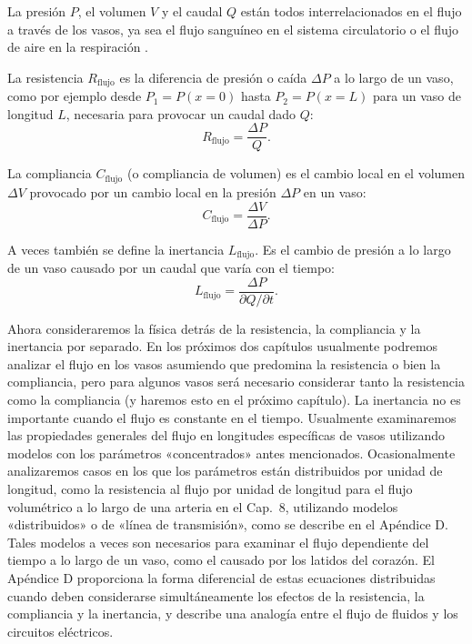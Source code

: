 \documentclass[12pt]{book}
\begin{document}
La presión $P$, el volumen $V$ y el caudal $Q$ están todos interrelacionados en el flujo a través de los vasos, ya sea el flujo sanguíneo en el sistema circulatorio o el flujo de aire en la respiración \cite{22,27,28}.

La resistencia $R_{\text{flujo}}$ es la diferencia de presión o caída $\Delta P$ a lo largo de un vaso, como por ejemplo desde $P_1 = P(x = 0)$ hasta $P_2 = P(x = L)$ para un vaso de longitud $L$, necesaria para provocar un caudal dado $Q$:
\begin{equation}
R_{\text{flujo}} = \frac{\Delta P}{Q}.
\label{eq:719}
\end{equation}

La compliancia $C_{\text{flujo}}$ (o compliancia de volumen) es el cambio local en el volumen $\Delta V$ provocado por un cambio local en la presión $\Delta P$ en un vaso:
\begin{equation}
C_{\text{flujo}} = \frac{\Delta V}{\Delta P}.
\label{eq:720}
\end{equation}

A veces también se define la inertancia $L_{\text{flujo}}$. Es el cambio de presión a lo largo de un vaso causado por un caudal que varía con el tiempo:
\begin{equation}
L_{\text{flujo}} = \frac{\Delta P}{\partial Q/\partial t}.
\label{eq:721}
\end{equation}

Ahora consideraremos la física detrás de la resistencia, la compliancia y la inertancia por separado. En los próximos dos capítulos usualmente podremos analizar el flujo en los vasos asumiendo que predomina la resistencia o bien la compliancia, pero para algunos vasos será necesario considerar tanto la resistencia como la compliancia (y haremos esto en el próximo capítulo). La inertancia no es importante cuando el flujo es constante en el tiempo. Usualmente examinaremos las propiedades generales del flujo en longitudes específicas de vasos utilizando modelos con los parámetros «concentrados» antes mencionados. Ocasionalmente analizaremos casos en los que los parámetros están distribuidos por unidad de longitud, como la resistencia al flujo por unidad de longitud para el flujo volumétrico a lo largo de una arteria en el Cap.~8, utilizando modelos «distribuidos» o de «línea de transmisión», como se describe en el Apéndice D. Tales modelos a veces son necesarios para examinar el flujo dependiente del tiempo a lo largo de un vaso, como el causado por los latidos del corazón. El Apéndice D proporciona la forma diferencial de estas ecuaciones distribuidas cuando deben considerarse simultáneamente los efectos de la resistencia, la compliancia y la inertancia, y describe una analogía entre el flujo de fluidos y los circuitos eléctricos.
\end{document}
